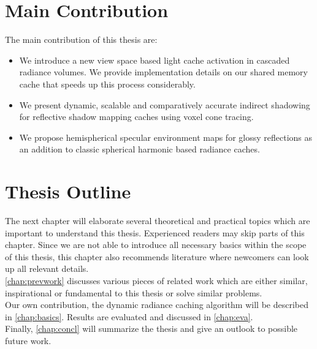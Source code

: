 \documentclass[thesis.tex]{subfiles}
\begin{document}
\section{Main Contribution}
The main contribution of this thesis are:
\begin{itemize}
\item We introduce a new view space based light cache activation in cascaded radiance volumes. We provide implementation details on our shared memory cache that speeds up this process considerably.
\item We present dynamic, scalable and comparatively accurate indirect shadowing for reflective shadow mapping caches using voxel cone tracing.
\item We propose hemispherical specular environment maps for glossy reflections as an addition to classic spherical harmonic based radiance caches.
\end{itemize}


\section{Thesis Outline}
The next chapter will elaborate several theoretical and practical topics which are important to understand this thesis. %
Experienced readers may skip parts of this chapter.
Since we are not able to introduce all necessary basics within the scope of this thesis, this chapter also recommends literature where newcomers can look up all relevant details.
\\
\autoref{chap:prevwork} discusses various pieces of related work which are either similar, inspirational or fundamental to this thesis or solve similar problems.
\\
Our own contribution, the dynamic radiance caching algorithm will be described in \autoref{chap:basics}.
Results are evaluated and discussed in \autoref{chap:eva}.
\\
Finally, \autoref{chap:concl} will summarize the thesis and give an outlook to possible future work.

\subfilebib %
\end{document}
